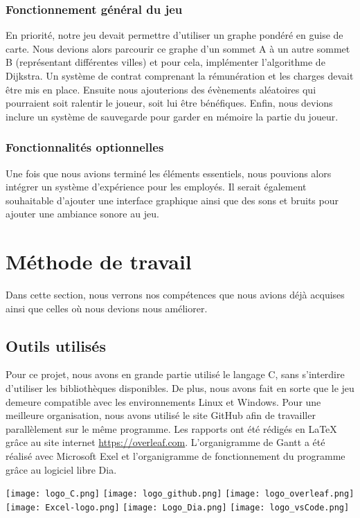 \documentclass[a4paper, 12pt]{article}
\begin{document}
      \subsubsection{Fonctionnement général du jeu}
        En priorité, notre jeu devait permettre d'utiliser un graphe pondéré en guise de carte. Nous devions alors parcourir ce graphe d'un sommet A à un autre sommet B (représentant différentes villes) et pour cela, implémenter l'algorithme de Dijkstra. Un système de contrat comprenant la rémunération et les charges devait être mis en place. Ensuite nous ajouterions des évènements aléatoires qui pourraient soit ralentir le joueur, soit lui être bénéfiques. Enfin, nous devions inclure un système de sauvegarde pour garder en mémoire la partie du joueur.
      \subsubsection{Fonctionnalités optionnelles}
       Une fois que nous avions terminé les éléments essentiels, nous pouvions alors intégrer un système d'expérience pour les employés. Il serait également souhaitable d'ajouter une interface graphique ainsi que des sons et bruits pour ajouter une ambiance sonore au jeu.

\section{Méthode de travail}
     Dans cette section, nous verrons nos compétences que nous avions déjà acquises ainsi que celles où nous devions nous améliorer.
      \subsection{Outils utilisés}
         Pour ce projet, nous avons en grande partie utilisé le langage C, sans s’interdire d'utiliser les bibliothèques disponibles. De plus, nous avons fait en sorte que le jeu demeure compatible avec les environnements Linux et Windows. Pour une meilleure organisation, nous avons utilisé le site GitHub afin de travailler parallèlement sur le même programme.
         Les rapports ont été rédigés en LaTeX grâce au site internet  \url{https://overleaf.com}. L'organigramme de Gantt a été réalisé avec Microsoft Exel et l'organigramme de fonctionnement du programme grâce au logiciel libre Dia.\newline
        
         \texttt{[image: logo\_C.png]}
         \texttt{[image: logo\_github.png]}
         \texttt{[image: logo\_overleaf.png]}\newline
         \texttt{[image: Excel-logo.png]}
         \texttt{[image: Logo\_Dia.png]}
         \texttt{[image: logo\_vsCode.png]}
         
\end{document}
